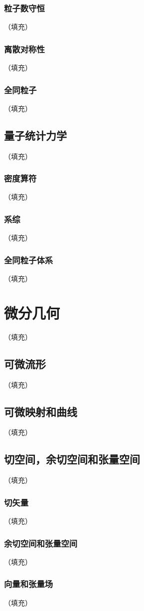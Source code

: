 \documentclass[hyperref,UTF8]{ctexbook}
\begin{document}
\subsection{粒子数守恒}（填充）
\subsection{离散对称性}（填充）
\subsection{全同粒子}（填充）
\section{量子统计力学}（填充）
\subsection{密度算符}（填充）
\subsection{系综}（填充）
\subsection{全同粒子体系}（填充）
\chapter{微分几何}（填充）
\section{可微流形}（填充）
\section{可微映射和曲线}（填充）
\section{切空间，余切空间和张量空间}（填充）
\subsection{切矢量}（填充）
\subsection{余切空间和张量空间}（填充）
\subsection{向量和张量场}（填充）
\end{document}
